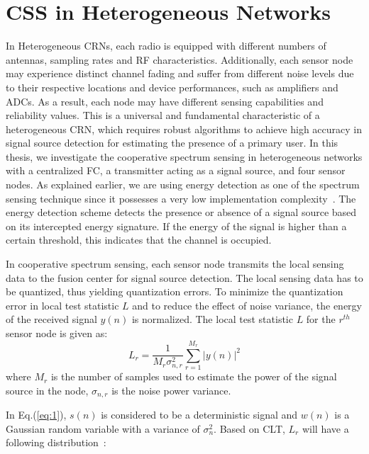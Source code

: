 \section{CSS in Heterogeneous Networks}
In Heterogeneous CRNs, each radio is equipped with different numbers of antennas, sampling rates and RF characteristics. Additionally, each sensor node may experience distinct channel fading and suffer from different noise levels due to their respective locations and device performances, such as amplifiers and ADCs.  As a result, each node may have different sensing capabilities and reliability values. This is a universal and fundamental characteristic of a heterogeneous CRN, which requires robust algorithms to achieve high accuracy in signal source detection for estimating the presence of a primary user\cite{arhtn13}. In this thesis, we investigate the cooperative spectrum sensing in heterogeneous networks with a centralized FC, a transmitter acting as a signal source, and four sensor nodes. As explained earlier, we are using energy detection as one of the spectrum sensing technique since it possesses a very low implementation complexity~\cite{arhtn4}. The energy detection scheme detects the presence or absence of a signal source based on its intercepted energy signature. If the energy of the signal is higher than a certain threshold, this indicates that the channel is occupied. 


In cooperative spectrum sensing, each sensor node transmits the local sensing data to the fusion center for signal source detection. The local sensing data has to be quantized, thus yielding quantization errors. To minimize the quantization error in local test statistic $L$ and to reduce the effect of noise variance, the energy of the received signal $y(n)$ is normalized\cite{arhtn13}. The local test statistic $L$ for the $r^{th}$ sensor node is given as:
\begin{equation}
	\label{eq:5}
	L_r = \dfrac{1}{M_r\sigma_{n,r}^2}\sum_{r=1}^{M_r}|y(n)|^2
\end{equation}
where $M_r$ is the number of samples used to estimate the power of the signal source in the node,  $\sigma_{n,r}$ is the noise power variance.

In Eq.(\ref{eq:1}), $s(n)$ is considered to be a deterministic signal and $w(n)$ is a Gaussian random variable with a variance of $\sigma_n^2$. Based on CLT, $L_r$ will have a following distribution~\cite{inphtn7}:

